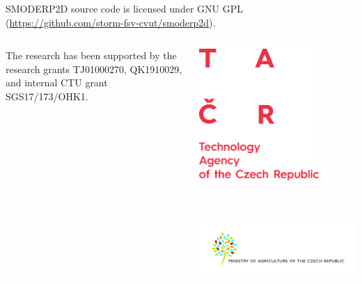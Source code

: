 \justifying
{\rmfamily
\vspace{0.4cm}
SMODERP2D source code is licensed under GNU
GPL (\url{https://github.com/storm-fsv-cvut/smoderp2d}).
}

\begin{columns}
    \begin{column}{0.4\textwidth}
        \justifying
        {\rmfamily
        The research has been supported by the research grants
        TJ01000270,
        QK1910029,
        and internal CTU grant SGS17/173/OHK1.
        }
    \end{column}
    \begin{column}{0.6\textwidth}
        \centering
        \includegraphics[height = 5cm]{obr/logo_TACR_dopln_AJ.png}
        \includegraphics[height = 5cm]{obr/LogoMZeAJ.jpg}
    \end{column}
\end{columns}




